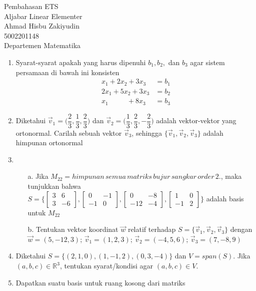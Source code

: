 \documentclass{article}
\begin{document}
 \begin{titlepage}
    \vspace*{\fill}
    \begin{center}
      \Huge {Pembahasan ETS \\ Aljabar Linear Elementer}\\[0.4cm] 
      \huge {Ahmad Hisbu Zakiyudin \\ 5002201148 \\ Departemen Matematika}\\[0.4cm]
    \end{center}
    \vspace*{\fill}
  \end{titlepage}
\newpage
{}
\begin{enumerate}
	\item Syarat-syarat apakah yang harus dipenuhi $b_1,b_2,$ dan $b_3$ agar sistem persamaan di bawah ini konsisten
	\begin{align*}
	x_1+2x_2+3x_3 &= b_1 \\
	2x_1+5x_2+3x_3 &= b_2 \\
	x_1 \, \, \, \, \quad \quad + 8x_3 &= b_3
	\end{align*}
	\item Diketahui $\vec v_1 = \Big(\dfrac{2}{3},\dfrac{1}{3},\dfrac{2}{3}\Big)$ dan $\vec v_2 = \Big(\dfrac{1}{3},\dfrac{2}{3},-\dfrac{2}{3}\Big)$ adalah vektor-vektor yang ortonormal. Carilah sebuah vektor $\vec v_3$, sehingga $\{\vec v_1,\vec v_2, \vec v_3\}$ adalah himpunan ortonormal
	\item \begin{enumerate}
	\item[a.] Jika $M_{22} = himpunan \, semua \, matriks \, bujur\, sangkar\, order\, 2.$, maka tunjukkan bahwa $S=\Bigg\{\begin{bmatrix}
	3 & 6\\
	3 & -6
	\end{bmatrix},\begin{bmatrix}
	0 & -1\\
	-1 & 0
	\end{bmatrix},\begin{bmatrix}
	0 & -8\\
	-12 & -4
	\end{bmatrix},\begin{bmatrix}
	1 & 0\\
	-1 & 2
	\end{bmatrix}\Bigg\}$ adalah basis untuk $M_{22}$
	\item[b.] Tentukan vektor koordinat $\vec w$ relatif terhadap $S=\{\vec v_1,\vec v_2,\vec v_3\}$ dengan $\vec w = (5,-12,3)$; $\vec v_1 = (1,2,3)$; $\vec v_2 = (-4,5,6)$; $\vec v_3 = (7,-8,9)$
	\end{enumerate}
	\item Diketahui $S=\{(2,1,0),(1,-1,2),(0,3,-4)\}$ dan $V=span(S)$. Jika $(a,b,c) \in \mathbb{R}^3$, tentukan syarat/kondisi agar $(a,b,c) \in V$.
	\item Dapatkan suatu basis untuk ruang kosong dari matriks
\end{enumerate}
\end{document}
